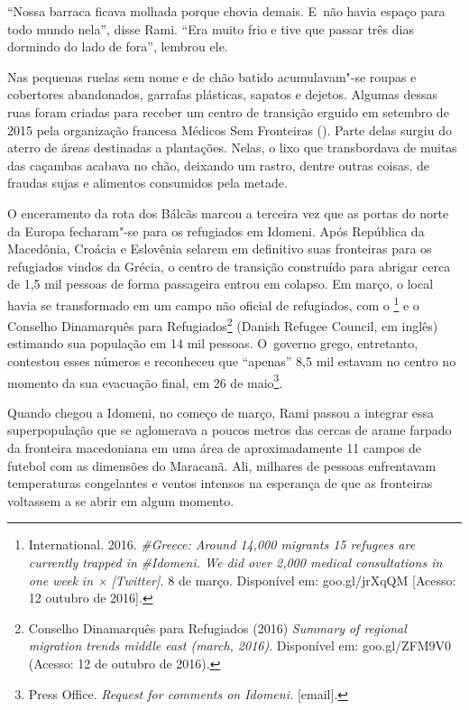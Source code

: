 ``Nossa barraca ficava molhada porque chovia demais. E~não havia espaço
para todo mundo nela'', disse Rami. ``Era muito frio e tive que passar
três dias dormindo do lado de fora'', lembrou ele.

Nas pequenas ruelas sem nome e de chão batido acumulavam"-se roupas e
cobertores abandonados, garrafas plásticas, sapatos e dejetos. Algumas
dessas ruas foram criadas para receber um centro de transição erguido em
setembro de 2015 pela organização francesa Médicos Sem Fronteiras ().
Parte delas surgiu do aterro de áreas destinadas a plantações. Nelas, o
lixo que transbordava de muitas das caçambas acabava no chão, deixando
um rastro, dentre outras coisas, de fraudas sujas e alimentos consumidos
pela metade.

O enceramento da rota dos Bálcãs marcou a terceira vez que as portas do
norte da Europa fecharam"-se para os refugiados em Idomeni. Após
República da Macedônia, Croácia e Eslovênia selarem em definitivo suas
fronteiras para os refugiados vindos da Grécia, o centro de transição
construído para abrigar cerca de 1,5 mil pessoas de forma passageira
entrou em colapso. Em março, o local havia se transformado em um campo
não oficial de refugiados, com o \footnote{  International. 2016.
\emph{{\#Greece}}\emph{:
Around 14,000 migrants 15 refugees are currently trapped in}
\emph{{\#Idomeni}}\emph{.
We did over 2,000 medical consultations in one week} \emph{in
×}\emph{ {[}Twitter{]}.} 8 de março. Disponível em:
{goo.gl/jrXqQM}
{[}Acesso: 12 outubro de 2016{]}.}  e o
Conselho Dinamarquês para Refugiados\footnote{ Conselho Dinamarquês para Refugiados (2016)
\emph{Summary of regional migration trends middle east (march, 2016)}.
Disponível em:
goo.gl/ZFM9V0
(Acesso: 12 de outubro de 2016).}  (Danish
Refugee Council, em inglês) estimando sua população em 14 mil pessoas. O~governo grego, entretanto, contestou esses números e reconheceu que
``apenas'' 8,5 mil estavam no centro no momento da sua evacuação final,
em 26 de maio\footnote{ Press Office. \emph{Request for comments on
Idomeni}\emph{.} {[}email{]}.}.

Quando chegou a Idomeni, no começo de março, Rami passou a integrar essa
superpopulação que se aglomerava a poucos metros das cercas de arame
farpado da fronteira macedoniana em uma área de aproximadamente 11
campos de futebol com as dimensões do Maracanã. Ali, milhares de pessoas
enfrentavam temperaturas congelantes e ventos intensos na esperança de
que as fronteiras voltassem a se abrir em algum momento.

